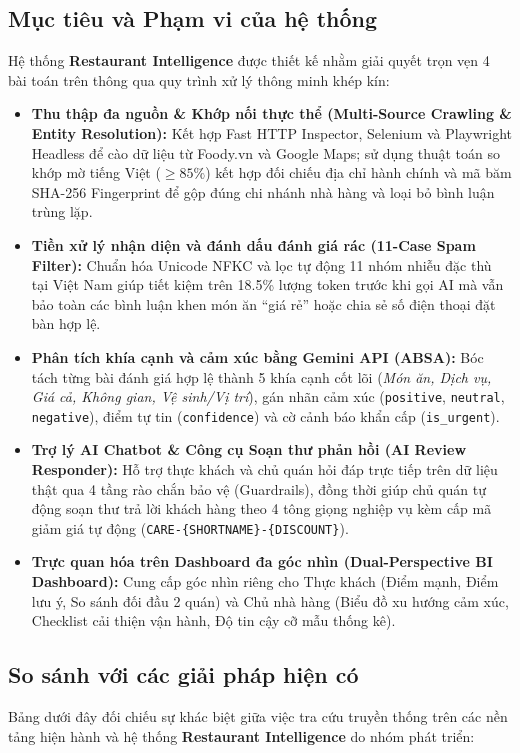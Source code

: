 \documentclass[12pt, a4paper]{article}
\begin{document}
\subsection{Mục tiêu và Phạm vi của hệ thống}
Hệ thống \textbf{Restaurant Intelligence} được thiết kế nhằm giải quyết trọn vẹn 4 bài toán trên thông qua quy trình xử lý thông minh khép kín:
\begin{itemize}[leftmargin=1.2cm]
    \item \textbf{Thu thập đa nguồn \& Khớp nối thực thể (Multi-Source Crawling \& Entity Resolution):} Kết hợp Fast HTTP Inspector, Selenium và Playwright Headless để cào dữ liệu từ Foody.vn và Google Maps; sử dụng thuật toán so khớp mờ tiếng Việt ($\ge 85\%$) kết hợp đối chiếu địa chỉ hành chính và mã băm SHA-256 Fingerprint để gộp đúng chi nhánh nhà hàng và loại bỏ bình luận trùng lặp.
    \item \textbf{Tiền xử lý nhận diện và đánh dấu đánh giá rác (11-Case Spam Filter):} Chuẩn hóa Unicode NFKC và lọc tự động 11 nhóm nhiễu đặc thù tại Việt Nam giúp tiết kiệm trên 18.5\% lượng token trước khi gọi AI mà vẫn bảo toàn các bình luận khen món ăn ``giá rẻ'' hoặc chia sẻ số điện thoại đặt bàn hợp lệ.
    \item \textbf{Phân tích khía cạnh và cảm xúc bằng Gemini API (ABSA):} Bóc tách từng bài đánh giá hợp lệ thành 5 khía cạnh cốt lõi (\textit{Món ăn, Dịch vụ, Giá cả, Không gian, Vệ sinh/Vị trí}), gán nhãn cảm xúc (\texttt{positive}, \texttt{neutral}, \texttt{negative}), điểm tự tin (\texttt{confidence}) và cờ cảnh báo khẩn cấp (\texttt{is\_urgent}).
    \item \textbf{Trợ lý AI Chatbot \& Công cụ Soạn thư phản hồi (AI Review Responder):} Hỗ trợ thực khách và chủ quán hỏi đáp trực tiếp trên dữ liệu thật qua 4 tầng rào chắn bảo vệ (Guardrails), đồng thời giúp chủ quán tự động soạn thư trả lời khách hàng theo 4 tông giọng nghiệp vụ kèm cấp mã giảm giá tự động (\texttt{CARE-\{SHORTNAME\}-\{DISCOUNT\}}).
    \item \textbf{Trực quan hóa trên Dashboard đa góc nhìn (Dual-Perspective BI Dashboard):} Cung cấp góc nhìn riêng cho Thực khách (Điểm mạnh, Điểm lưu ý, So sánh đối đầu 2 quán) và Chủ nhà hàng (Biểu đồ xu hướng cảm xúc, Checklist cải thiện vận hành, Độ tin cậy cỡ mẫu thống kê).
\end{itemize}

\subsection{So sánh với các giải pháp hiện có}
Bảng dưới đây đối chiếu sự khác biệt giữa việc tra cứu truyền thống trên các nền tảng hiện hành và hệ thống \textbf{Restaurant Intelligence} do nhóm phát triển:
\end{document}
